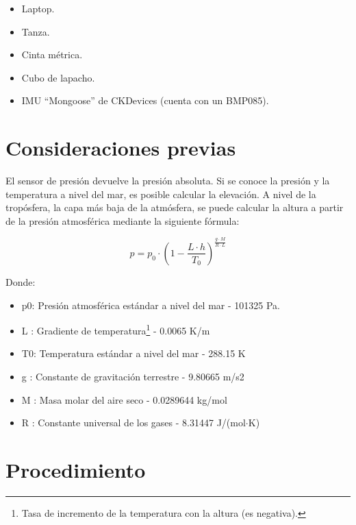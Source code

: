 \documentclass[main]{subfiles}
\begin{document}
\begin{itemize}
\item Laptop.
\item Tanza.
\item Cinta m\'etrica.
\item Cubo de lapacho.
\item IMU ``Mongoose'' de CKDevices (cuenta con un BMP085).
\end{itemize}

\section{Consideraciones previas}
\label{consideraciones}

El sensor de presi\'on devuelve la presi\'on absoluta. Si se conoce la presi\'on y la temperatura a nivel del mar, es posible calcular la elevaci\'on. A nivel de la trop\'osfera, la capa m\'as baja de la atm\'osfera, se puede calcular la altura a partir de la presi\'on atmosf\'erica mediante la siguiente f\'ormula\cite{bib:alt-press}:

\begin{equation}
  \label{eq:press-alt}
  p = p_0 \cdot \left(1 - \frac{L \cdot h}{T_0} \right)^\frac{g \cdot M}{R \cdot L}
\end{equation}

Donde:
\begin{itemize}
\item p0: 	Presi\'on atmosf\'erica est\'andar a nivel del mar -	101325 Pa.
\item L :	Gradiente de temperatura\footnote{Tasa de incremento de la temperatura con la altura (es negativa).} -	0.0065 K/m
\item T0:	Temperatura est\'andar a nivel del mar -	288.15 K
\item g :	Constante de gravitaci\'on terrestre -	9.80665 m/s2
\item M :	Masa molar del aire seco -	0.0289644 kg/mol
\item R :	Constante universal de los gases - 	8.31447 J/(mol$\cdot$K)
\end{itemize}


\section{Procedimiento}
\label{sec:procedimiento}
\end{document}
